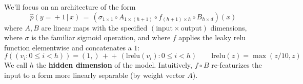         We'll focus on an architecture of the form
        $$
          \hat p(y\!=\!+1\,|\,x) \,=\,
          (\sigma_{1\times 1} \circ
          A_{1\times (h+1)} \circ
          f_{(h+1)\times h} \circ
          B_{h\times d})(x)
        $$
        where $A,B$ are linear maps with the specified
        $(\text{input}\times\text{output})$ dimensions, where $\sigma$ is the
        familiar sigmoid operation, and where $f$ applies the leaky relu
        function elementwise and concatenates a $1$:
        $$
          f((v_i : 0\leq i<h)) = (1,)\,+\!\!\!\!+\,(\text{lrelu}(v_i) : 0\leq i<h)
          \quad \quad
          \text{lrelu}(z) = \max(z/10, z)
        $$
        We call $h$ the \textbf{hidden dimension} of the model.
        Intuitively, $f \circ B$ re-featurizes the input to a form more
        linearly separable (by weight vector $A$).



